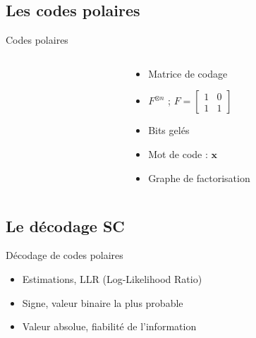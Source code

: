 \subsection*{Les codes polaires}
\begin{frame}[c]{Codes polaires}
	\begin{columns}[T] %
		\begin{column}{.65\textwidth}
		\end{column}
		\begin{column}{.35\textwidth}
		\begin{itemize}
			\item<1-> Matrice de codage
			\item<1->$F^{\otimes n}$ ; $F=\left[\begin{smallmatrix} 1 & 0 \\ 1 & 1\end{smallmatrix}\right]$
			\item<2-> Bits gelés
			\item<3-> Mot de code : $\mathbold{x}$
			\item<4-> Graphe de factorisation
		\end{itemize}
		\end{column}

	\end{columns}

\end{frame}
\subsection*{Le décodage SC}

\begin{frame}[c]{Décodage de codes polaires}
	\begin{itemize}
		\item<2> Estimations, LLR (Log-Likelihood Ratio)
		\item<2> Signe, valeur binaire la plus probable
		\item<2> Valeur absolue, fiabilité de l'information
	\end{itemize}
\end{frame}


